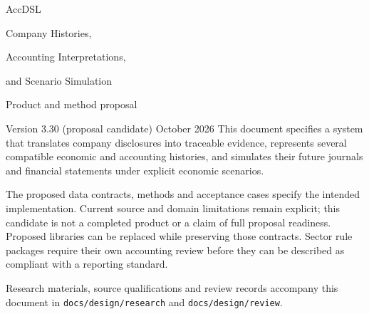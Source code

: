 \documentclass[11pt,a4paper]{report}
\newcommand{\code}[1]{\texttt{#1}}
\begin{document}
\hypersetup{pageanchor=false}
\begin{titlepage}
\vspace*{20mm}
{\sffamily\color{ink}\Huge AccDSL\par}
\vspace{7mm}
{\LARGE Company Histories,\par Accounting Interpretations,\par and Scenario Simulation\par}
\vspace{12mm}
{\Large Product and method proposal\par}
\vspace{5mm}
Version 3.30 (proposal candidate)  October 2026
\vfill
This document specifies a system that translates company disclosures into
traceable evidence, represents several compatible economic and accounting
histories, and simulates their future journals and financial statements under
explicit economic scenarios.

The proposed data contracts, methods and acceptance cases specify the intended
implementation. Current source and domain limitations remain explicit; this
candidate is not a completed product or a claim of full proposal readiness. Proposed libraries can be replaced while preserving those
contracts. Sector rule packages require their own accounting review before
they can be described as compliant with a reporting standard.

\vspace{8mm}
Research materials, source qualifications and review records accompany this
document in \code{docs/design/research} and \code{docs/design/review}.
\end{titlepage}
\hypersetup{pageanchor=true}
\tableofcontents
\clearpage{}














\appendix




\begingroup\raggedright

\endgroup
\end{document}
